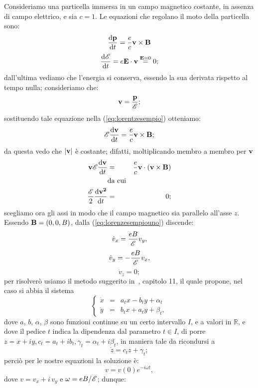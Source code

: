 \begin{esempio}
  Consideriamo una particella immersa in un campo magnetico costante,
  in assenza di campo elettrico, e sia $c = 1$. Le equazioni che
  regolano il moto della particella sono:
  \begin{equation}
    \frac{\mathrm{d} \mathbf{p}}{\mathrm{d} t} = \frac{e}{c} \mathbf{v \times B}
    \label{eq:lorentzesempio}
  \end{equation}
$$
\frac{\mathrm{d} \mathscr{E}}{\mathrm{d} t} = e \mathbf{E \cdot v} \stackrel{\mathbf{E}=0}{=}
0;
$$
dall'ultima vediamo che l'energia si conserva, essendo la sua derivata
rispetto al tempo nulla; consideriamo che:
\begin{equation}
  \mathbf{v} = \frac{\mathbf{p}}{\mathscr{E}};
\end{equation}
sostituendo tale equazione nella (\ref{eq:lorentzesempio}) otteniamo:
\begin{equation}
  \mathscr{E}\frac{\mathrm{d} \mathbf{v}}{\mathrm{d} t} = \frac{e}{c}\mathbf{v \times B};
  \label{eq:lorenzesempiouno}
\end{equation}
da questa vedo che $\mathbf{|v|}$ \`e costante; difatti, moltiplicando
membro a membro per $\mathbf{v}$
\begin{eqnarray*}
  \mathbf{v}\mathscr{E}\frac{\mathrm{d} \mathbf{v}}{\mathrm{d} t} & = &
  \frac{e}{c}\mathbf{v\cdot (v \times B)}\\
  & \mbox{da cui} & \\
  \frac{\mathscr{E}}{2} \frac{\mathrm{d} \mathbf{v^2}}{\mathrm{d} t} & = & 0;
\end{eqnarray*}
scegliamo ora gli assi in modo che il campo magnetico sia parallelo
all'asse $z$. Essendo $\mathbf{B} = (0,0,B)$, dalla
(\ref{eq:lorenzesempiouno}) discende:
$$
\dot{v}_x = \frac{e B}{\mathscr{E}}v_y,
$$
$$
\dot{v}_y = -\frac{e B}{\mathscr{E}}v_x,
$$
$$
\dot{v}_z = 0;
$$
per risolver\`o usiamo il metodo suggerito in~\cite{gdmdue}, capitolo
11, il quale propone, nel caso si abbia il sistema
$$
\left\{
  \begin{array}{ccc}
    \dot{x} & = & a_t x - b_t y + \alpha_t \\
    \dot{y} & = & b_t x + a_t y + \beta_t,
  \end{array}
\right.
$$
dove $a,\,b,\,\alpha,\,\beta$ sono funzioni continue su un certo
intervallo $I$, e a valori in $\mathbb{R}$, e dove il pedice $t$
indica la dipendenza dal parametro $t\in I$, di porre $z = x + i y,
c_t = a_t + i b_t, \gamma_t = \alpha_t + i \beta_t $, in maniera tale
da ricondursi a
$$
\dot{z} = c_t z + \gamma_t;
$$
perci\`o per le nostre equazioni la soluzione \`e:
$$
v = v(0) e^{-i\omega t},
$$
dove $v = v_x + i\, v_y$ e $\omega = e B / \mathscr{E}$; dunque:

\end{esempio}
